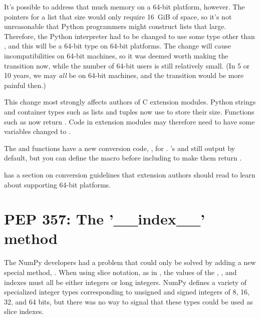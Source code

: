 \documentclass{howto}
\begin{document}
It's possible to address that much memory on a 64-bit platform,
however.  The pointers for a list that size would only require 16~GiB
of space, so it's not unreasonable that Python programmers might
construct lists that large.  Therefore, the Python interpreter had to
be changed to use some type other than , and this will be a
64-bit type on 64-bit platforms.  The change will cause
incompatibilities on 64-bit machines, so it was deemed worth making
the transition now, while the number of 64-bit users is still
relatively small.  (In 5 or 10 years, we may \emph{all} be on 64-bit
machines, and the transition would be more painful then.)

This change most strongly affects authors of C extension modules.  
Python strings and container types such as lists and tuples 
now use  to store their size.  
Functions such as  
now return .  Code in extension modules
may therefore need to have some variables changed to
.  

The  and  functions
have a new conversion code, , for .  
's  and  still output
 by default, but you can define the macro 
 before including  
to make them return .

 has a section on conversion guidelines that 
extension authors should read to learn about supporting 64-bit
platforms.

\begin{seealso}


\end{seealso}


\section{PEP 357: The '__index__' method\label{pep-357}}

The NumPy developers had a problem that could only be solved by adding
a new special method, .  When using slice notation,
as in , the values of the
, , and  indexes must all be either
integers or long integers.  NumPy defines a variety of specialized
integer types corresponding to unsigned and signed integers of 8, 16,
32, and 64 bits, but there was no way to signal that these types could
be used as slice indexes.
\end{document}
